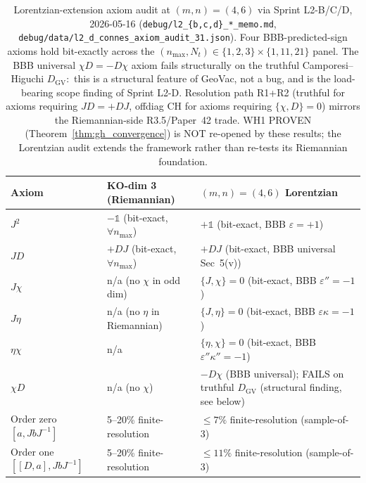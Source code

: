 \documentclass[11pt]{article}
\begin{document}
\begin{table}[h]
\centering
\begin{tabular}{lll}
\toprule
Axiom & KO-dim 3 (Riemannian) & $(m, n) = (4, 6)$ Lorentzian \\
\midrule
$J^2$
  & $-\mathbb{1}$ (bit-exact, $\forall n_{\max}$)
  & $+\mathbb{1}$ (bit-exact, BBB $\varepsilon = +1$) \\
$JD$
  & $+DJ$ (bit-exact, $\forall n_{\max}$)
  & $+DJ$ (bit-exact, BBB universal Sec~5(v)) \\
$J\chi$
  & n/a (no $\chi$ in odd dim)
  & $\{J, \chi\} = 0$ (bit-exact, BBB $\varepsilon'' = -1$) \\
$J\eta$
  & n/a (no $\eta$ in Riemannian)
  & $\{J, \eta\} = 0$ (bit-exact, BBB $\varepsilon\kappa = -1$) \\
$\eta\chi$
  & n/a
  & $\{\eta, \chi\} = 0$ (bit-exact, BBB $\varepsilon''\kappa'' = -1$) \\
$\chi D$
  & n/a (no $\chi$)
  & $-D\chi$ (BBB universal); FAILS on truthful $D_{\mathrm{GV}}$
    (structural finding, see below) \\
Order zero $[a, JbJ^{-1}]$
  & 5--20\% finite-resolution
  & $\le 7\%$ finite-resolution (sample-of-3) \\
Order one $[[D,a], JbJ^{-1}]$
  & 5--20\% finite-resolution
  & $\le 11\%$ finite-resolution (sample-of-3) \\
\bottomrule
\end{tabular}
\caption{Lorentzian-extension axiom audit at $(m, n) = (4, 6)$
via Sprint L2-B/C/D, 2026-05-16
(\texttt{debug/l2\_\{b,c,d\}\_*\_memo.md},
\texttt{debug/data/l2\_d\_connes\_axiom\_audit\_31.json}).
Four BBB-predicted-sign axioms hold bit-exactly across the
$(n_{\max}, N_t) \in \{1, 2, 3\} \times \{1, 11, 21\}$ panel.  The
BBB universal $\chi D = -D\chi$ axiom fails structurally on the
truthful Camporesi--Higuchi $D_{\mathrm{GV}}$:\ this is a structural
feature of GeoVac, not a bug, and is the load-bearing scope finding
of Sprint L2-D.  Resolution path R1+R2 (truthful for axioms requiring
$JD = +DJ$, offdiag CH for axioms requiring $\{\chi, D\} = 0$) mirrors
the Riemannian-side R3.5/Paper~42 trade.  WH1 PROVEN
(Theorem~\ref{thm:gh_convergence}) is NOT re-opened by these results;
the Lorentzian audit extends the framework rather than re-tests its
Riemannian foundation.}
\label{tab:axiom_audit_lorentzian}
\end{table}
\end{document}
